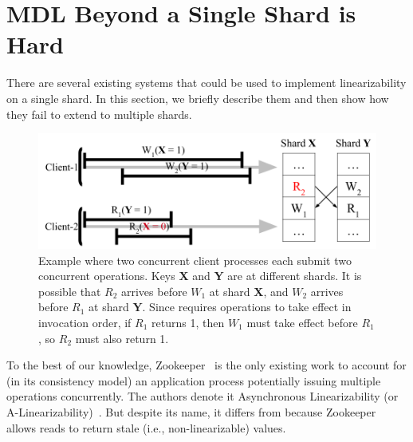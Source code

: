 \section{MDL Beyond a Single Shard is Hard}
\label{sec:mdl:zookeeper}



There are several existing systems that could be used to implement
\multidispatch{} linearizability on a single shard. In this section,
we briefly describe them and then show how they fail to extend to
multiple shards.

\begin{figure}[!tb]
    \centering
    \includegraphics[width=\linewidth]{figs/somet.png}
    \caption{Example where two concurrent client processes each submit two concurrent operations. Keys \textbf{X} and \textbf{Y} are at different shards. It is possible that $R_2$ arrives before $W_1$ at shard \textbf{X}, and $W_2$ arrives before $R_1$ at shard \textbf{Y}. Since \MDL{} requires operations to take effect in invocation order, if $R_1$ returns 1, then $W_1$ must take effect before $R_1$, so $R_2$ must also return 1.}
    \label{fig:concurrentbatches}
\end{figure}

To the best of our knowledge, Zookeeper~\cite{hunt2010zookeeper} is the
only existing work to account for (in its consistency model) an 
application process potentially issuing multiple operations concurrently. The authors denote it Asynchronous Linearizability
(or A-Linearizability)~\cite{hunt2010zookeeper}. But despite its name,
it differs from \MDL{} because Zookeeper allows
reads to return stale (i.e., non-linearizable) values.

